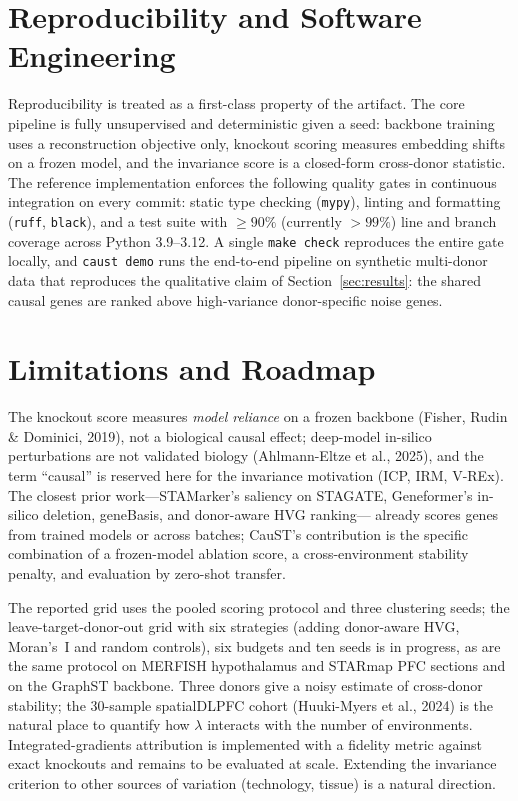 \documentclass[11pt]{article}
\begin{document}
\section{Reproducibility and Software Engineering}
\label{sec:reproducibility}

Reproducibility is treated as a first-class property of the artifact. The core
pipeline is fully unsupervised and deterministic given a seed: backbone training
uses a reconstruction objective only, knockout scoring measures embedding shifts
on a frozen model, and the invariance score is a closed-form cross-donor
statistic. The reference implementation enforces the following quality gates in
continuous integration on every commit: static type checking (\texttt{mypy}),
linting and formatting (\texttt{ruff}, \texttt{black}), and a test suite with
$\ge 90\%$ (currently $>99\%$) line and branch coverage across Python
3.9--3.12. A single \texttt{make check} reproduces the entire gate locally, and
\texttt{caust demo} runs the end-to-end pipeline on synthetic multi-donor data
that reproduces the qualitative claim of Section~\ref{sec:results}: the shared
causal genes are ranked above high-variance donor-specific noise genes.

\section{Limitations and Roadmap}
\label{sec:limitations}

The knockout score measures \emph{model reliance} on a frozen backbone
(Fisher, Rudin \& Dominici, 2019), not a biological causal effect; deep-model
in-silico perturbations are not validated biology (Ahlmann-Eltze et al., 2025),
and the term ``causal'' is reserved here for the invariance motivation
(ICP, IRM, V-REx). The closest prior work---STAMarker's saliency on STAGATE,
Geneformer's in-silico deletion, geneBasis, and donor-aware HVG ranking---
already scores genes from trained models or across batches; CauST's
contribution is the specific combination of a frozen-model ablation score, a
cross-environment stability penalty, and evaluation by zero-shot transfer.

The reported grid uses the pooled scoring protocol and three clustering seeds;
the leave-target-donor-out grid with six strategies (adding donor-aware HVG,
Moran's~I and random controls), six budgets and ten seeds is in progress, as
are the same protocol on MERFISH hypothalamus and STARmap PFC sections and on
the GraphST backbone. Three donors give a noisy estimate of cross-donor
stability; the 30-sample spatialDLPFC cohort (Huuki-Myers et al., 2024) is the
natural place to quantify how $\lambda$ interacts with the number of
environments. Integrated-gradients attribution is implemented with a fidelity
metric against exact knockouts and remains to be evaluated at scale. Extending
the invariance criterion to other sources of variation (technology, tissue) is
a natural direction.
\end{document}
